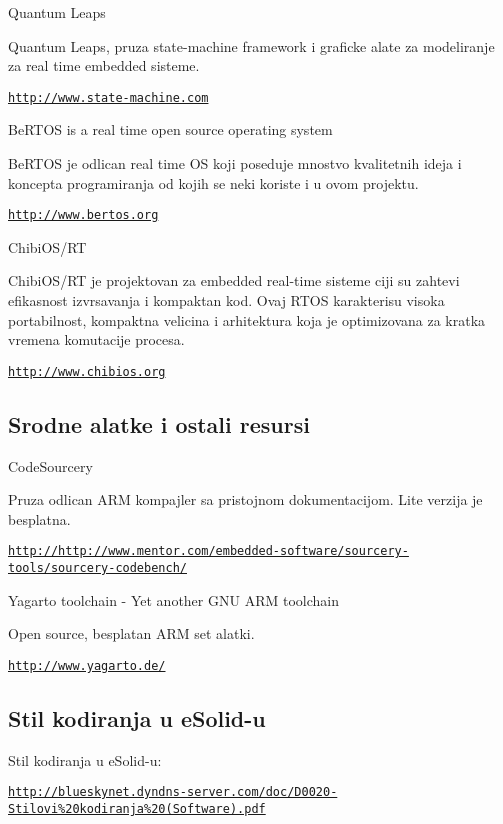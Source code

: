 \begin{DoxyItemize}
\item Quantum Leaps \par
Quantum Leaps, pruza state-\/machine framework i graficke alate za modeliranje za real time embedded sisteme. \par
\href{http://www.state-machine.com}{\tt http\-://www.\-state-\/machine.\-com}
\item Be\-R\-T\-O\-S is a real time open source operating system \par
 Be\-R\-T\-O\-S je odlican real time O\-S koji poseduje mnostvo kvalitetnih ideja i koncepta programiranja od kojih se neki koriste i u ovom projektu. \par
\href{http://www.bertos.org}{\tt http\-://www.\-bertos.\-org}
\item Chibi\-O\-S/\-R\-T \par
Chibi\-O\-S/\-R\-T je projektovan za embedded real-\/time sisteme ciji su zahtevi efikasnost izvrsavanja i kompaktan kod. Ovaj R\-T\-O\-S karakterisu visoka portabilnost, kompaktna velicina i arhitektura koja je optimizovana za kratka vremena komutacije procesa. \par
\href{http://www.chibios.org}{\tt http\-://www.\-chibios.\-org}
\end{DoxyItemize}\hypertarget{lit_lit_tools_and_resources}{}\subsection{Srodne alatke i ostali resursi}\label{lit_lit_tools_and_resources}

\begin{DoxyItemize}
\item Code\-Sourcery\par
Pruza odlican A\-R\-M kompajler sa pristojnom dokumentacijom. Lite verzija je besplatna. \par
\href{http://http://www.mentor.com/embedded-software/sourcery-tools/sourcery-codebench/}{\tt http\-://http\-://www.\-mentor.\-com/embedded-\/software/sourcery-\/tools/sourcery-\/codebench/}
\item Yagarto toolchain -\/ Yet another G\-N\-U A\-R\-M toolchain\par
 Open source, besplatan A\-R\-M set alatki. \par
\href{http://www.yagarto.de/}{\tt http\-://www.\-yagarto.\-de/}
\end{DoxyItemize}\hypertarget{lit_lit_coding_rules}{}\subsection{Stil kodiranja u e\-Solid-\/u}\label{lit_lit_coding_rules}

\begin{DoxyItemize}
\item Stil kodiranja u e\-Solid-\/u\-: \par
\href{http://blueskynet.dyndns-server.com/doc/D0020-Stilovi%20kodiranja%20(Software).pdf}{\tt http\-://blueskynet.\-dyndns-\/server.\-com/doc/\-D0020-\/\-Stilovi\%20kodiranja\%20(\-Software).\-pdf} 
\end{DoxyItemize}
